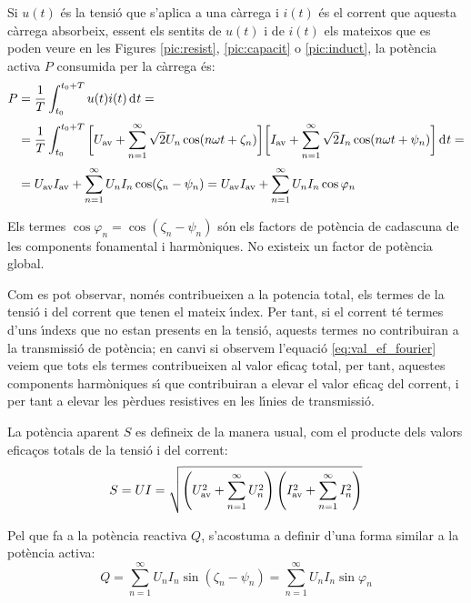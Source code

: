 Si  $u(t)$ \'{e}s la tensi\'{o} que s'aplica a una c\`{a}rrega i $i(t)$ \'{e}s el
corrent que aquesta c\`{a}rrega absorbeix, essent els sentits de $u(t)$
i de $i(t)$ els mateixos que es poden veure en les Figures
\ref{pic:resist}, \ref{pic:capacit} o \ref{pic:induct}, la pot\`{e}ncia
activa $P$ consumida per la c\`{a}rrega \'{e}s:
\begin{equation}\begin{split}
    P &= \frac{1}{T} \int_{t_0}^{t_0+T} u(t) i(t) \diff t =
    \\[0.5ex]
     &= \frac{1}{T} \int_{t_0}^{t_0+T} \bigg[U\ped{av} + \sum_{n=1}^\infty
    \sqrt{2} U_n \cos (n \omega t + \zeta_n) \bigg]
    \bigg[I\ped{av} + \sum_{n=1}^\infty \sqrt{2} I_n
    \cos (n \omega t + \psi_n)\bigg] \diff t=\\[0.5ex]
    &=U\ped{av}I\ped{av} + \sum_{n=1}^\infty U_n I_n
    \cos(\zeta_n-\psi_n) = U\ped{av}I\ped{av} + \sum_{n=1}^\infty U_n I_n
    \cos \varphi_n \label{eq:pot_fu}
\end{split}\end{equation}

Els termes $\cos \varphi_n=\cos (\zeta_n-\psi_n)$ s\'{o}n els factors de
pot\`{e}ncia de cadascuna de les components fonamental i harm\`{o}niques. No
existeix un factor de pot\`{e}ncia global.

 Com es pot observar, nom\'{e}s contribueixen a la potencia
total, els termes de la tensi\'{o} i del corrent que tenen el mateix
\'{\i}ndex. Per tant, si el corrent t\'{e} termes d'uns \'{\i}ndexs que no estan
presents en la tensi\'{o}, aquests termes no contribuiran a la
transmissi\'{o} de  pot\`{e}ncia; en canvi si observem l'equaci\'{o}
\eqref{eq:val_ef_fourier} veiem que tots els termes contribueixen al
valor efica\c{c} total, per tant, aquestes components harm\`{o}niques s\'{\i} que
contribuiran a elevar el valor efica\c{c} del corrent, i per tant a
elevar les p\`{e}rdues resistives en les l\'{\i}nies de transmissi\'{o}.

La pot\`{e}ncia aparent $S$ es defineix de la manera usual, com el
producte dels valors efica\c{c}os totals de la tensi\'{o} i del corrent:
\begin{equation}
    S = U I = \sqrt{ \left(U_\mathrm{av}^2 + \sum_{n=1}^{\infty}U^2_n\right)
    \left(I_\mathrm{av}^2 + \sum_{n=1}^{\infty}I^2_n\right) }
\end{equation}

Pel que fa  a la pot\`{e}ncia reactiva $Q$, s'acostuma  a definir d'una
forma similar a la pot\`{e}ncia activa:
\begin{equation}
    Q = \sum_{n=1}^\infty U_n I_n
    \sin(\zeta_n-\psi_n) =  \sum_{n=1}^\infty U_n I_n
    \sin \varphi_n
\end{equation}

